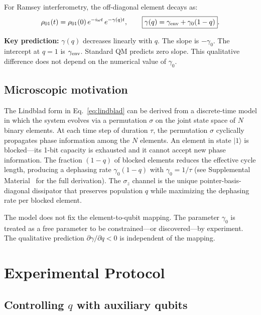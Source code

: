 \documentclass[aps,prl,twocolumn,superscriptaddress,hyperref]{revtex4-2}
\begin{document}
For Ramsey interferometry, the off-diagonal element decays as:
\begin{equation}
\rho_{01}(t) = \rho_{01}(0)\,e^{-i\omega t}\,e^{-\gamma(q)t},
\qquad \boxed{\gamma(q) = \gamma_{\rm env} + \gamma_0(1-q)}.
\label{eq:contrast}
\end{equation}

\textbf{Key prediction:} $\gamma(q)$ decreases linearly with $q$. The slope is $-\gamma_0$. The intercept at $q=1$ is $\gamma_{\rm env}$. Standard QM predicts zero slope. This qualitative difference does not depend on the numerical value of $\gamma_0$.

\subsection{Microscopic motivation}

The Lindblad form in Eq.~\eqref{eq:lindblad} can be derived from a discrete-time model in which the system evolves via a permutation $\sigma$ on the joint state space of $N$ binary elements. At each time step of duration $\tau$, the permutation $\sigma$ cyclically propagates phase information among the $N$ elements. An element in state $|1\rangle$ is blocked---its 1-bit capacity is exhausted and it cannot accept new phase information. The fraction $(1-q)$ of blocked elements reduces the effective cycle length, producing a dephasing rate $\gamma_0(1-q)$ with $\gamma_0 = 1/\tau$ (see Supplemental Material~\cite{SM} for the full derivation). The $\sigma_z$ channel is the unique pointer-basis-diagonal dissipator that preserves population $q$ while maximizing the dephasing rate per blocked element.

The model does not fix the element-to-qubit mapping. The parameter $\gamma_0$ is treated as a free parameter to be constrained---or discovered---by experiment. The qualitative prediction $\partial\gamma/\partial q < 0$ is independent of the mapping.

\section{Experimental Protocol}

\subsection{Controlling $q$ with auxiliary qubits}
\end{document}
